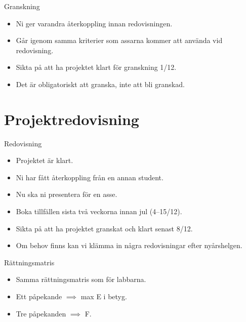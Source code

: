 \begin{frame}
  \begin{block}{Granskning}
    \begin{itemize}
      \item Ni ger varandra återkoppling innan redovisningen.
      \item Går igenom samma kriterier som assarna kommer att använda vid 
        redovisning.
      \item \alert{Sikta på att ha projektet klart för granskning 1/12.}
      \end{itemize}
  \end{block}

  \pause

  \begin{remark}
    \begin{itemize}
      \item Det är obligatoriskt att granska, inte att bli granskad.
    \end{itemize}
  \end{remark}
\end{frame}


\section{Projektredovisning}

\begin{frame}
  \begin{block}{Redovisning}
    \begin{itemize}
      \item Projektet är klart.
      \item Ni har fått återkoppling från en annan student.
      \item Nu ska ni presentera för en asse.
      \item Boka tillfällen sista två veckorna innan jul (4--15/12).
      \item \alert{Sikta på att ha projektet granskat och klart senast 8/12.}
    \end{itemize}
  \end{block}

  \pause

  \begin{remark}
    \begin{itemize}
      \item Om behov finns kan vi klämma in några redovisningar efter 
        nyårshelgen.
    \end{itemize}
  \end{remark}
\end{frame}

\begin{frame}
  \begin{block}{Rättningsmatris}
    \begin{itemize}
      \item Samma rättningsmatris som för labbarna.
      \item Ett påpekande \(\implies\) max E i betyg.
      \item Tre påpekanden \(\implies\) F.
    \end{itemize}
  \end{block}
\end{frame}

